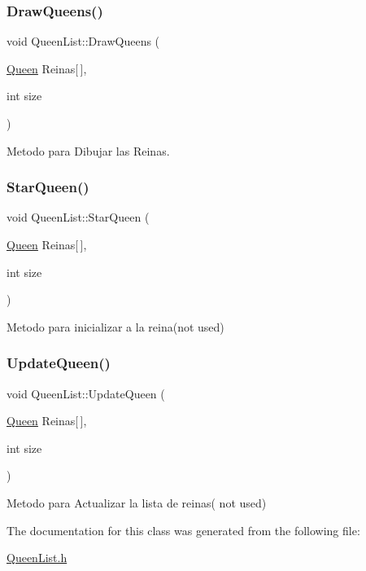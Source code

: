\subsubsection{\texorpdfstring{Draw\+Queens()}{DrawQueens()}}
{\footnotesize\ttfamily void Queen\+List\+::\+Draw\+Queens (\begin{DoxyParamCaption}\item[{\hyperlink{class_queen}{Queen}}]{Reinas\mbox{[}$\,$\mbox{]},  }\item[{int}]{size }\end{DoxyParamCaption})}



Metodo para Dibujar las Reinas. 

\mbox{\label{class_queen_list_a7c681fcfc96c5804ea62a6bc0f643c29}} 
\subsubsection{\texorpdfstring{Star\+Queen()}{StarQueen()}}
{\footnotesize\ttfamily void Queen\+List\+::\+Star\+Queen (\begin{DoxyParamCaption}\item[{\hyperlink{class_queen}{Queen}}]{Reinas\mbox{[}$\,$\mbox{]},  }\item[{int}]{size }\end{DoxyParamCaption})}



Metodo para inicializar a la reina(not used) 

\mbox{\label{class_queen_list_a01d2804b98bda4e492fd96f328168ecb}} 
\subsubsection{\texorpdfstring{Update\+Queen()}{UpdateQueen()}}
{\footnotesize\ttfamily void Queen\+List\+::\+Update\+Queen (\begin{DoxyParamCaption}\item[{\hyperlink{class_queen}{Queen}}]{Reinas\mbox{[}$\,$\mbox{]},  }\item[{int}]{size }\end{DoxyParamCaption})}



Metodo para Actualizar la lista de reinas( not used) 



The documentation for this class was generated from the following file\+:\begin{DoxyCompactItemize}
\item 
\hyperlink{_queen_list_8h}{Queen\+List.\+h}\end{DoxyCompactItemize}
